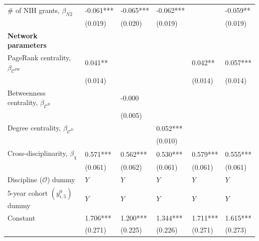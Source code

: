 \documentclass{article}\usepackage[]{graphicx}\usepackage[]{color}
\begin{document}
\begin{table}[h!]
\begin{center}
{\begin{tabular}{l l l l l l}
    \rowcolor{gray!33}
    {\#} of NIH grants, $\beta_{N2}$ 
    & -0.061*** & -0.065***  & -0.062*** &           & -0.059**  \\
    {} 
    & (0.019)   & (0.020)    & (0.019)   &           & (0.019)   \\
    
    \hline
    
    \textbf {Network parameters}\\
    
    \rowcolor{gray!33}
    PageRank centrality, $\beta_{\mathscr{C}^{PR}}$ 
    & 0.041**  &            &            & 0.042**   & 0.057***  \\
    {} 
    & (0.014)  &            &            & (0.014)   & (0.014)   \\
    
    \rowcolor{gray!33}
    Betweenness centrality, $\beta_{\mathscr{C}^{B}}$ 
    &          & -0.000     &            &           &           \\
    {} 
    &          & (0.005)    &            &           &           \\
    
    \rowcolor{gray!33}
    Degree centrality, $\beta_{\mathscr{C}^{D}}$ 
    &          &            & 0.052***   &           &            \\
    {} 
    &          &            & (0.010)    &           &            \\
    
    \rowcolor{gray!33}
    Cross-disciplinarity, $\beta_{\chi}$ 
    & 0.571*** & 0.562***   & 0.530***   & 0.579***  & 0.555***    \\
    {} 
    & (0.061)  & (0.062)    & (0.061)    & (0.061)   & (0.061)     \\
    
    \hline
    
    \rowcolor{gray!33} 
    Discipline ($\mathscr{O}$) dummy & $\textit{Y}$ & $\textit{Y}$ & $\textit{Y}$ & $\textit{Y}$ & $\textit{Y}$ \\
    
    \rowcolor{gray!33} 
    5-year cohort $(y{^0_{i,5}})$ dummy & $\textit{Y}$ & $\textit{Y}$ & $\textit{Y}$ & $\textit{Y}$ & $\textit{Y}$ \\
    
    \rowcolor{gray!33} 
    Constant 
    & 1.706*** & 1.200***   & 1.344***   & 1.711***  & 1.615***  \\
    {} 
    & (0.271)  & (0.225)    & (0.226)    & (0.271)   & (0.273)   \\
    

\end{tabular}}
\end{center}
\end{table}
\end{document}
